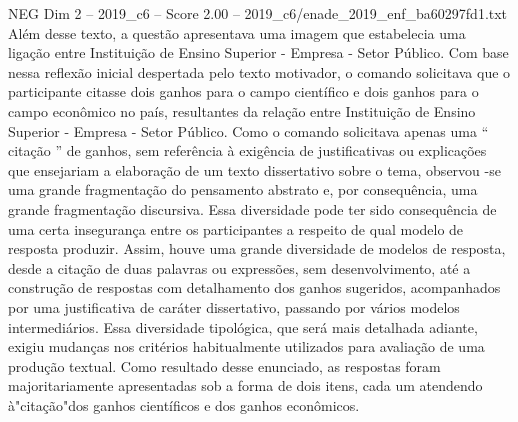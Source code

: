 \begin{textsample}{NEG Dim 2 – 2019\_c6 – Score 2.00 – 2019\_c6/enade\_2019\_enf\_ba60297fd1.txt}
Além desse texto, a questão apresentava uma imagem que estabelecia uma ligação entre Instituição de Ensino Superior - Empresa - Setor Público.
Com base nessa reflexão inicial despertada pelo texto motivador, o comando solicitava que o participante citasse dois ganhos para o campo científico e dois ganhos para o campo econômico no país, resultantes da relação entre Instituição de Ensino Superior - Empresa - Setor Público.
Como o comando solicitava apenas uma “ citação ” de ganhos, sem referência à exigência de justificativas ou explicações que ensejariam a elaboração de um texto dissertativo sobre o tema, observou -se uma grande fragmentação do pensamento abstrato e, por consequência, uma grande fragmentação discursiva.
Essa diversidade pode ter sido consequência de uma certa insegurança entre os participantes a respeito de qual modelo de resposta produzir.
Assim, houve uma grande diversidade de modelos de resposta, desde a citação de duas palavras ou expressões, sem desenvolvimento, até a construção de respostas com detalhamento dos ganhos sugeridos, acompanhados por uma justificativa de caráter dissertativo, passando por vários modelos intermediários.
Essa diversidade tipológica, que será mais detalhada adiante, exigiu mudanças nos critérios habitualmente utilizados para avaliação de uma produção textual.
Como resultado desse enunciado, as respostas foram majoritariamente apresentadas sob a forma de dois itens, cada um atendendo à"citação"dos ganhos científicos e dos ganhos econômicos.

\end{textsample}
